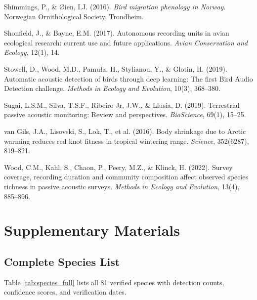 \documentclass[twocolumn]{article}
\begin{document}
\begin{thebibliography}{99}
 Shimmings, P., \& Øien, I.J. (2016). \textit{Bird migration phenology in Norway}. Norwegian Ornithological Society, Trondheim.

 Shonfield, J., \& Bayne, E.M. (2017). Autonomous recording units in avian ecological research: current use and future applications. \textit{Avian Conservation and Ecology}, 12(1), 14.

 Stowell, D., Wood, M.D., Pamuła, H., Stylianou, Y., \& Glotin, H. (2019). Automatic acoustic detection of birds through deep learning: The first Bird Audio Detection challenge. \textit{Methods in Ecology and Evolution}, 10(3), 368--380.

 Sugai, L.S.M., Silva, T.S.F., Ribeiro Jr, J.W., \& Llusia, D. (2019). Terrestrial passive acoustic monitoring: Review and perspectives. \textit{BioScience}, 69(1), 15--25.

 van Gils, J.A., Lisovski, S., Lok, T., et al. (2016). Body shrinkage due to Arctic warming reduces red knot fitness in tropical wintering range. \textit{Science}, 352(6287), 819--821.

 Wood, C.M., Kahl, S., Chaon, P., Peery, M.Z., \& Klinck, H. (2022). Survey coverage, recording duration and community composition affect observed species richness in passive acoustic surveys. \textit{Methods in Ecology and Evolution}, 13(4), 885--896.

\end{thebibliography}

\newpage
\onecolumn

\appendix
\section{Supplementary Materials}

\subsection{Complete Species List}

Table \ref{tab:species_full} lists all 81 verified species with detection counts, confidence scores, and verification dates.
\end{document}
